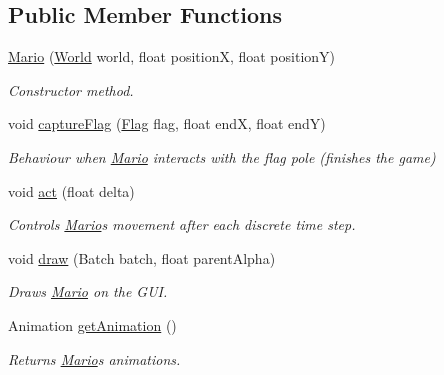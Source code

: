 \subsection*{Public Member Functions}
\begin{DoxyCompactItemize}
\item 
\hyperlink{classnl_1_1arjanfrans_1_1mario_1_1model_1_1Mario_a3e3683dae8285b1bb0608d493b9b532a}{Mario} (\hyperlink{classnl_1_1arjanfrans_1_1mario_1_1model_1_1World}{World} world, float positionX, float positionY)
\begin{DoxyCompactList}\small\item\em Constructor method. \end{DoxyCompactList}\item 
void \hyperlink{classnl_1_1arjanfrans_1_1mario_1_1model_1_1Mario_a8e22f381330317da3aca016f4713f88a}{capture\+Flag} (\hyperlink{classnl_1_1arjanfrans_1_1mario_1_1model_1_1Flag}{Flag} flag, float endX, float endY)
\begin{DoxyCompactList}\small\item\em Behaviour when \hyperlink{classnl_1_1arjanfrans_1_1mario_1_1model_1_1Mario}{Mario} interacts with the flag pole (finishes the game) \end{DoxyCompactList}\item 
void \hyperlink{classnl_1_1arjanfrans_1_1mario_1_1model_1_1Mario_a231319aab3b67229e23c0ff4510c5239}{act} (float delta)
\begin{DoxyCompactList}\small\item\em Controls \hyperlink{classnl_1_1arjanfrans_1_1mario_1_1model_1_1Mario}{Mario}\textquotesingle{}s movement after each discrete time step. \end{DoxyCompactList}\item 
void \hyperlink{classnl_1_1arjanfrans_1_1mario_1_1model_1_1Mario_a50937f347ddf9eb8f114ad78e57e559c}{draw} (Batch batch, float parent\+Alpha)
\begin{DoxyCompactList}\small\item\em Draws \hyperlink{classnl_1_1arjanfrans_1_1mario_1_1model_1_1Mario}{Mario} on the G\+UI. \end{DoxyCompactList}\item 
Animation \hyperlink{classnl_1_1arjanfrans_1_1mario_1_1model_1_1Mario_a73c861a72b4a0ec8c7e87da0da5dac47}{get\+Animation} ()
\begin{DoxyCompactList}\small\item\em Returns \hyperlink{classnl_1_1arjanfrans_1_1mario_1_1model_1_1Mario}{Mario}\textquotesingle{}s animations. \end{DoxyCompactList}\item 

\end{DoxyCompactItemize}

